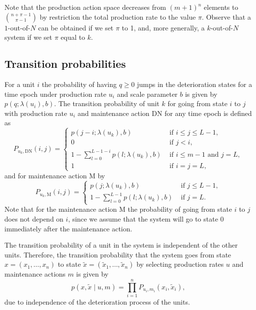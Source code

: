 \documentclass[a4paper,12pt]{article}
\begin{document}
Note that the production action space decreases from $(m+1)^n$ elements to ${n + \pi - 1} \choose{\pi - 1} $ by restriction the total production rate to the value $\pi$. Observe that a $1$-out-of-$N$ can be obtained if we set $\pi$ to 1, and, more generally, a $k$-out-of-$N$ system if we set $\pi$ equal to $k$. 

\subsection{Transition probabilities}
For a unit $i$ the probability of having $q \geq 0$ jumps in the deterioration states for a time epoch under production rate $u_i$ and scale parameter $b$ is given by $p(q; \lambda(u_i), b)$. The transition probability of unit $k$ for going from state $i$ to $j$ with production rate $u_i$ and maintenance action DN for any time epoch is defined as
$$
P_{u_k,\text{DN}}(i,j) = \begin{cases}
p(j-i; \lambda(u_k), b) &\text{ if } i \leq j \leq L-1, \\
0 &\text{ if } j < i, \\
1 - \sum_{l=0}^{L-1-i}p(l; \lambda(u_k), b) & \text{ if } i \leq m-1  \text{ and } j = L, \\
1 & \text{ if } i = j = L,
\end{cases}
$$
and for maintenance action M by
$$
P_{u_k,\text{M}}(i,j) = \begin{cases}
p(j; \lambda(u_k), b)&\text{ if } j \leq  L-1, \\
1 - \sum_{l=0}^{L-1}p(l; \lambda(u_k), b) & \text{ if } j = L.
\end{cases}
$$
Note that for the maintenance action M the probability of going from state $i$ to $j$ does not depend on $i$, since we assume that the system will go to state 0 immediately after the maintenance action.

The transition probability of a unit in the system is independent of the other units. Therefore, the transition probability that the system goes from state $x = (x_1, \dots, x_n)$ to state $\tilde{x} = (\tilde{x}_1, \dots, \tilde{x}_n)$ by selecting production rates $u$ and maintenance actions $m$ is given by
$$
p(x, \tilde{x} \mid u, m) = \prod_{i = 1}^nP_{u_i,m_i}(x_i, \tilde{x}_i),
$$
due to independence of the deterioration process of the units.
\end{document}
